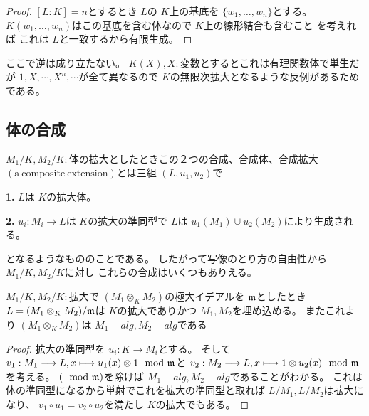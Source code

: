\documentclass[../master_galois_theory]{subfiles}
\begin{document}
\begin{proof}
  $[L:K] = n$とするとき
  $L$の $K$上の基底を $\{ w_1 , \dots , w_n \}$とする。
  $K(w_1 , \dots , w_n)$はこの基底を含む体なので $K$上の線形結合も含むこと
  を考えれば
  これは $L$と一致するから有限生成。
\end{proof}

ここで逆は成り立たない。
$K(X) , X:$変数とするとこれは有理関数体で単生だが
$1 , X , \cdots , X^n , \cdots$が全て異なるので
$K$の無限次拡大となるような反例があるためである。

\subsection{体の合成}

\begin{defi}
  $M_1/K , M_2/K:$体の拡大としたときこの２つの\underline{合成、合成体、合成拡大 $(\mathrm{a \  composite \  extension})$}とは三組 $(L,u_1,u_2)$で

  \textbf{1.}
  $L$は $K$の拡大体。

  \textbf{2.}
  $u_i : M_i \longrightarrow L$は $K$の拡大の準同型で
  $L$は $u_1(M_1) \cup u_2(M_2)$により生成される。

  となるようなもののことである。
  したがって写像のとり方の自由性から $M_1/K , M_2/K$に対し
  これらの合成はいくつもありえる。
\end{defi}

\begin{corl} \label{corl:scholium}
  $M_1/K , M_2/K:$拡大で $(M_1 \otimes_K M_2)$の極大イデアルを $\mathfrak{m}$としたとき
  $L = (M_1 \otimes_K M_2)/ \mathfrak{m}$は $K$の拡大でありかつ
  $M_1 , M_2$を埋め込める。
  またこれより $(M_1 \otimes_K M_2)$は $M_1-alg , M_2-alg$である
\end{corl}

\begin{proof}
  拡大の準同型を $u_i : K \longrightarrow M_i$とする。
  そして
  $v_1 : M_1 \longrightarrow L , x \longmapsto u_1(x) \otimes 1 \mod {\mathfrak{m}}$と
  $v_2 : M_2 \longrightarrow L , x \longmapsto 1 \otimes u_2(x) \mod {\mathfrak{m}}$を考える。
  $(\mod {\mathfrak{m}})$を除けば $M_1-alg , M_2-alg$であることがわかる。
  これは体の準同型になるから単射でこれを拡大の準同型と取れば
  $L/M_1 , L/M_2$は拡大になり、
  $v_1 \circ u_1 = v_2 \circ u_2$を満たし $K$の拡大でもある。


\end{proof}

\clearpage
\end{document}

